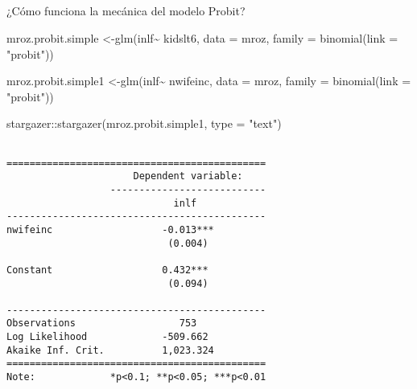 \documentclass[
  letterpaper,
  DIV=11,
  numbers=noendperiod]{scrreprt}
\makeatletter
\let\oldsubparagraph\subparagraph
\renewcommand{\subparagraph}{
    \@ifstar
      \xxxSubParagraphStar
      \xxxSubParagraphNoStar
  }
\newcommand{\xxxSubParagraphStar}[1]{\oldsubparagraph*{#1}\mbox{}}
\newcommand{\xxxSubParagraphNoStar}[1]{\oldsubparagraph{#1}\mbox{}}
\newenvironment{Shaded}{\begin{snugshade}}{\end{snugshade}}
\newcommand{\AttributeTok}[1]{\textcolor[rgb]{0.40,0.45,0.13}{#1}}
\newcommand{\FunctionTok}[1]{\textcolor[rgb]{0.28,0.35,0.67}{#1}}
\newcommand{\NormalTok}[1]{\textcolor[rgb]{0.00,0.23,0.31}{#1}}
\newcommand{\OtherTok}[1]{\textcolor[rgb]{0.00,0.23,0.31}{#1}}
\newcommand{\SpecialCharTok}[1]{\textcolor[rgb]{0.37,0.37,0.37}{#1}}
\newcommand{\StringTok}[1]{\textcolor[rgb]{0.13,0.47,0.30}{#1}}
\makeatother
\begin{document}
\subparagraph{¿Cómo funciona la mecánica del modelo
Probit?}\label{cuxf3mo-funciona-la-mecuxe1nica-del-modelo-probit}

\begin{Shaded}
\begin{Highlighting}[]
\NormalTok{mroz.probit.simple }\OtherTok{\textless{}{-}}\FunctionTok{glm}\NormalTok{(inlf}\SpecialCharTok{\textasciitilde{}}
\NormalTok{                           kidslt6,}
                         \AttributeTok{data =}\NormalTok{ mroz,}
                         \AttributeTok{family =} \FunctionTok{binomial}\NormalTok{(}\AttributeTok{link =} \StringTok{"probit"}\NormalTok{))}

\NormalTok{mroz.probit.simple1 }\OtherTok{\textless{}{-}}\FunctionTok{glm}\NormalTok{(inlf}\SpecialCharTok{\textasciitilde{}}
\NormalTok{                           nwifeinc,}
                         \AttributeTok{data =}\NormalTok{ mroz,}
                         \AttributeTok{family =} \FunctionTok{binomial}\NormalTok{(}\AttributeTok{link =} \StringTok{"probit"}\NormalTok{))}

\NormalTok{stargazer}\SpecialCharTok{::}\FunctionTok{stargazer}\NormalTok{(mroz.probit.simple1, }\AttributeTok{type =} \StringTok{"text"}\NormalTok{)}
\end{Highlighting}
\end{Shaded}

\begin{verbatim}

=============================================
                      Dependent variable:    
                  ---------------------------
                             inlf            
---------------------------------------------
nwifeinc                   -0.013***         
                            (0.004)          
                                             
Constant                   0.432***          
                            (0.094)          
                                             
---------------------------------------------
Observations                  753            
Log Likelihood             -509.662          
Akaike Inf. Crit.          1,023.324         
=============================================
Note:             *p<0.1; **p<0.05; ***p<0.01
\end{verbatim}

\begin{Shaded}
\end{Shaded}
\end{document}
